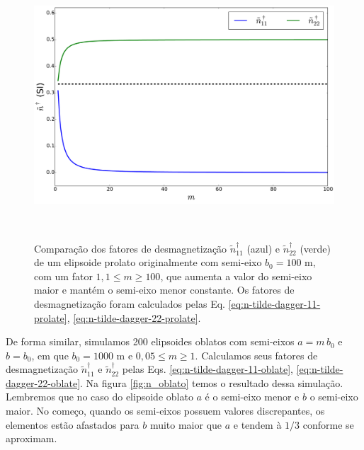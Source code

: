\begin{figure}[hbt!]
	\centering \includegraphics[width=15cm,height=10cm]{figures/test_n_prolate}
	\caption[Comparação dos fatores de desmagnetização
	$\tilde{n}^{\dagger}_{11}$ (azul) e $\tilde{n}^{\dagger}_{22}$ (verde) de um elipsoide prolato originalmente com semi-eixo $b_0=100$ m, com um fator $1,1 \le m \ge 100$, que aumenta a valor do semi-eixo maior e mantém o semi-eixo menor constante. Os fatores de desmagnetização foram calculados pelas Eq. \ref{eq:n-tilde-dagger-11-prolate}, \ref{eq:n-tilde-dagger-22-prolate}.]{Comparação dos fatores de desmagnetização
		$\tilde{n}^{\dagger}_{11}$ (azul) e $\tilde{n}^{\dagger}_{22}$ (verde) de um elipsoide prolato originalmente com semi-eixo $b_0=100$ m, com um fator $1,1 \le m \ge 100$, que aumenta a valor do semi-eixo maior e mantém o semi-eixo menor constante. Os fatores de desmagnetização foram calculados pelas Eq. \ref{eq:n-tilde-dagger-11-prolate}, \ref{eq:n-tilde-dagger-22-prolate}.}
	\label{fig:n_prolato}
\end{figure}

De forma similar, simulamos 200 elipsoides oblatos com semi-eixos $a=m\, b_0$ e $b=b_0$, em que $b_0=1000$ m e $0,05 \le m \ge 1$. Calculamos seus fatores de desmagnetização $\tilde{n}^{\dagger}_{11}$ e $\tilde{n}^{\dagger}_{22}$ pelas Eqs. \ref{eq:n-tilde-dagger-11-oblate}, \ref{eq:n-tilde-dagger-22-oblate}. Na figura \ref{fig:n_oblato} temos o resultado dessa simulação. Lembremos que no caso do elipsoide oblato $a$ é o semi-eixo menor e $b$ o semi-eixo maior. No começo, quando os semi-eixos possuem valores discrepantes, os elementos estão afastados para $b$ muito maior que $a$ e tendem à $1/3$ conforme se aproximam.
\newpage

